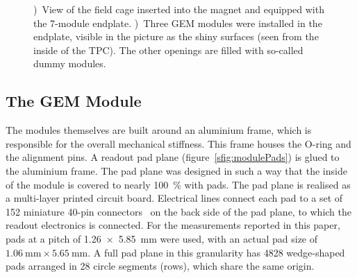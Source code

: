 \documentclass[preprint]{elsarticle}
\begin{document}
\begin{figure}[t]
\begin{subfigure}[b]{0.3945\textwidth}
\iftoggle{blackandwhite}{\texttt{[image: figures/endplate\_electronicsBW.jpg]}}{\texttt{[image: figures/endplate\_electronics.jpg]}}
\caption{}
\label{sfig:fieldcage}
\end{subfigure}
\hfill
\begin{subfigure}[b]{0.48\textwidth}
\iftoggle{blackandwhite}{\texttt{[image: figures/endplate\_gemBW.jpg]}}{\texttt{[image: figures/endplate\_gem.jpg]}}
\caption{}
\label{sfig:endplateShiny}
\end{subfigure}
\caption{\small \protect{})~View of the field cage inserted into the magnet and equipped with the 7-module endplate.
\protect{})~Three GEM modules were installed in the endplate, visible in the picture as the shiny surfaces (seen from the inside of the TPC). The other openings are filled with so-called dummy modules.}
\label{fig:endplate}
\end{figure}


\subsection{The GEM Module}
The modules themselves are built around an aluminium frame, which is responsible for the overall mechanical stiffness. This frame houses the O-ring and the alignment pins. A readout pad plane (figure~\ref{sfig:modulePads}) is glued to the aluminium frame. 
The pad plane was designed in such a way that the inside of the module is covered to nearly \SI{100}{\percent} with pads. The pad plane is realised as a multi-layer printed circuit board. Electrical lines connect each pad to a set of 152 miniature 40-pin connectors~\cite{Connector} on the back side of the pad plane, to which the readout electronics is connected. For the measurements reported in this paper, pads at a pitch of \SI{1.26 x 5.85}{\mm} were used, with an actual pad size of $ \SI{1.06}{\mm} \times \SI{5.65}{\mm}$.
A full pad plane in this granularity has 4828 wedge-shaped pads arranged in 28 circle segments (rows), which share the same origin.
\end{document}
